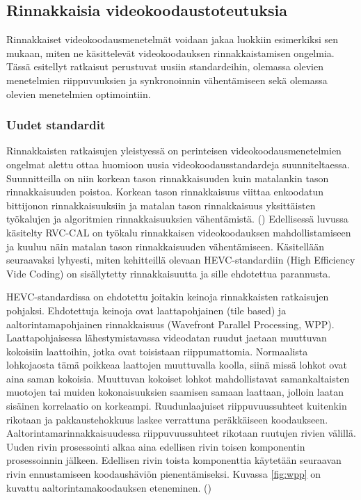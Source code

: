 \subsection{Rinnakkaisia videokoodaustoteutuksia}

Rinnakkaiset videokoodausmenetelmät voidaan jakaa luokkiin esimerkiksi sen
mukaan, miten ne käsittelevät videokoodauksen rinnakkaistamisen ongelmia.
Tässä esitellyt ratkaisut perustuvat uusiin standardeihin, olemassa olevien
menetelmien riippuvuuksien ja synkronoinnin
vähentämiseen sekä olemassa olevien menetelmien optimointiin.

\subsubsection{Uudet standardit}

Rinnakkaisten ratkaisujen yleistyessä on perinteisen videokoodausmenetelmien
ongelmat alettu ottaa huomioon uusia
videokoodausstandardeja suunniteltaessa. Suunnitteilla on niin korkean
tason rinnakkaisuuden kuin matalankin tason rinnakkaisuuden poistoa. Korkean
tason rinnakkaisuus viittaa enkoodatun bittijonon rinnakkaisuuksiin ja matalan
tason rinnakkaisuus yksittäisten työkalujen ja algoritmien rinnakkaisuuksien
vähentämistä. (\citealt{choi}) Edellisessä luvussa käsitelty RVC-CAL on työkalu
rinnakkaisen videokoodauksen mahdollistamiseen ja kuuluu näin matalan tason rinnakkaisuuden
vähentämiseen.
Käsitellään seuraavaksi lyhyesti, miten kehitteillä
olevaan HEVC-standardiin (High Efficiency Vide Coding) on sisällytetty rinnakkaisuutta ja sille ehdotettua
parannusta.

HEVC-standardissa on ehdotettu joitakin keinoja rinnakkaisten
ratkaisujen pohjaksi. Ehdotettuja keinoja ovat laattapohjainen (tile based) ja
aaltorintamapohjainen rinnakkaisuus (Wavefront Parallel Processing, WPP).
Laattapohjaisessa lähestymistavassa videodatan ruudut jaetaan muuttuvan
kokoisiin laattoihin, jotka ovat toisistaan riippumattomia. Normaalista
lohkojaosta tämä poikkeaa laattojen muuttuvalla koolla, siinä missä lohkot
ovat aina saman kokoisia. Muuttuvan kokoiset lohkot mahdollistavat
samankaltaisten muotojen tai muiden kokonaisuuksien saamisen samaan laattaan,
jolloin laatan sisäinen korrelaatio on korkeampi. Ruudunlaajuiset
riippuvuussuhteet kuitenkin rikotaan ja pakkaustehokkuus laskee verrattuna
peräkkäiseen koodaukseen. Aaltorintamarinnakkaisuudessa riippuvuussuhteet
rikotaan ruutujen rivien välillä. Uuden rivin prosessointi alkaa aina edellisen
rivin toisen komponentin prosessoinnin jälkeen. Edellisen rivin toista
komponenttia käytetään seuraavan rivin ennustamiseen koodaushäviön
pienentämiseksi. Kuvassa \ref{fig:wpp} on kuvattu aaltorintamakoodauksen
eteneminen. (\citealt{chi})

